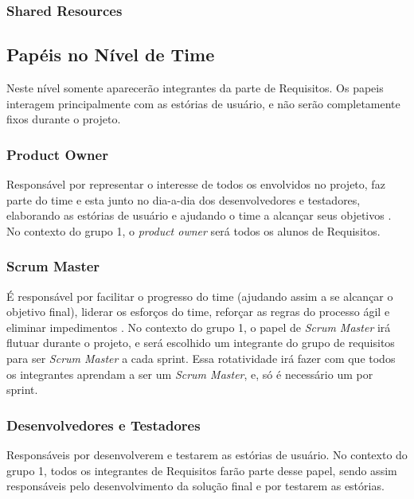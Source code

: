 \subsubsection{Shared Resources}

\subsection{Papéis no Nível de Time}
Neste nível somente aparecerão integrantes da parte de Requisitos. Os papeis interagem principalmente com as estórias de usuário, e não serão completamente fixos durante o projeto.

\subsubsection{Product Owner}
Responsável por representar o interesse de todos os envolvidos no projeto, faz parte do time e esta junto no dia-a-dia dos desenvolvedores e testadores, elaborando as estórias de usuário e ajudando o time a alcançar seus objetivos \cite[p. 47-48]{safe001}. No contexto do grupo 1, o \emph{product owner} será todos os alunos de Requisitos.

\subsubsection{Scrum Master}
É responsável por facilitar o progresso do time (ajudando assim a se alcançar o objetivo final), liderar os esforços do time, reforçar as regras do processo ágil e eliminar impedimentos \cite[p. 47-48]{safe001}. No contexto do grupo 1, o papel de \emph{Scrum Master} irá flutuar durante o projeto, e será escolhido um integrante do grupo de requisitos para ser \emph{Scrum Master} a cada sprint. Essa rotatividade irá fazer com que todos os integrantes aprendam a ser um \emph{Scrum Master}, e, só é necessário um por sprint.

\subsubsection{Desenvolvedores e Testadores}
Responsáveis por desenvolverem e testarem as estórias de usuário. No contexto do grupo 1, todos os integrantes de Requisitos farão parte desse papel, sendo assim responsáveis pelo desenvolvimento da solução final e por testarem as estórias.